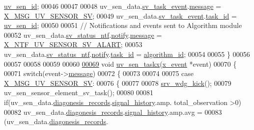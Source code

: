 \begin{DoxyCode}
      \hyperlink{a00073_afd789f3f9ea182d28d4f16db0d8d5652}{uv\_sen\_id};
00046 
00047 
00048     uv\_sen\_data.\hyperlink{a00035_a43c345f39ea3aefbb60ef1ef57fe5d83}{sv\_task\_event}.\hyperlink{a00036_adf9665938515a20c283eea2c978cf80d}{message}                    = 
      \hyperlink{a00035_a88ce8cfec1a4d1cf613a890254880e24}{X\_MSG\_UV\_SENSOR\_SV};
00049     uv\_sen\_data.\hyperlink{a00035_a43c345f39ea3aefbb60ef1ef57fe5d83}{sv\_task\_event}.\hyperlink{a00036_a21b41e494a28583d4da10f1afb1c5328}{task\_id}                = 
      \hyperlink{a00073_afd789f3f9ea182d28d4f16db0d8d5652}{uv\_sen\_id};
00050 
00051     \textcolor{comment}{// Notifications and events sent to Algorithm module}
00052     uv\_sen\_data.\hyperlink{a00035_afdc0e2c51e8e301d264700f4f9c10740}{sv\_status\_ntf}.\hyperlink{a00021_a8e6a04c2283f9fd7b8dcbc62faba5847}{notify}.\hyperlink{a00036_adf9665938515a20c283eea2c978cf80d}{message}                       = 
      \hyperlink{a00021_a146527c519502db561ac17015bf9df5b}{X\_NTF\_UV\_SENSOR\_SV\_ALART};
00053     uv\_sen\_data.\hyperlink{a00035_afdc0e2c51e8e301d264700f4f9c10740}{sv\_status\_ntf}.\hyperlink{a00021_a8e6a04c2283f9fd7b8dcbc62faba5847}{notify}.\hyperlink{a00036_a21b41e494a28583d4da10f1afb1c5328}{task\_id}                   = 
      \hyperlink{a00021_aff3e3d622fcd96787628167d3c1856f9}{algorithm\_id};
00054 
00055 \}
00056 
00057 
00058 
00059 
00060 
\hypertarget{a00073_source_l00069}{}\hyperlink{a00073_ab4e931568892f0b46a2571d3c480f5c8}{00069} \textcolor{keywordtype}{void} \hyperlink{a00073_ab4e931568892f0b46a2571d3c480f5c8}{uv\_sen\_taskx}(\hyperlink{a00036_de/d37/a00849}{x\_event} *event)
00070 \{
00071     \textcolor{keywordflow}{switch}(event->\hyperlink{a00036_adf9665938515a20c283eea2c978cf80d}{message})
00072     \{
00073 
00074 
00075         \textcolor{keywordflow}{case} \hyperlink{a00035_a88ce8cfec1a4d1cf613a890254880e24}{X\_MSG\_UV\_SENSOR\_SV}:
00076         \{
00077 
00078             \hyperlink{a00067_a710d148845397582739d170341f3d3d9}{srv\_wdg\_kick}();
00079             uv\_sen\_sensor\_element\_sv\_task();
00080 
00081             \textcolor{keywordflow}{if}(uv\_sen\_data.\hyperlink{a00035_a7ae905b560513ad201e58c2f63375030}{diagonesis\_records}.\hyperlink{a00017_affb63906d23cb1cb7787d61eaaedfb60}{signal\_history}.amp.
      total\_observation >0)
00082                 uv\_sen\_data.\hyperlink{a00035_a7ae905b560513ad201e58c2f63375030}{diagonesis\_records}.\hyperlink{a00017_affb63906d23cb1cb7787d61eaaedfb60}{signal\_history}.amp.avg =
00083                         (uv\_sen\_data.\hyperlink{a00035_a7ae905b560513ad201e58c2f63375030}{diagonesis\_records}.

\end{DoxyCode}
